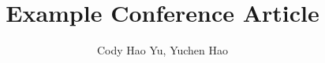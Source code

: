 \documentclass[sigconf]{acmart}
\author{
Cody Hao Yu, Yuchen Hao
}
\begin{document}
\title{
Example Conference Article
}



\maketitle




{
\scriptsize

}
\end{document}

